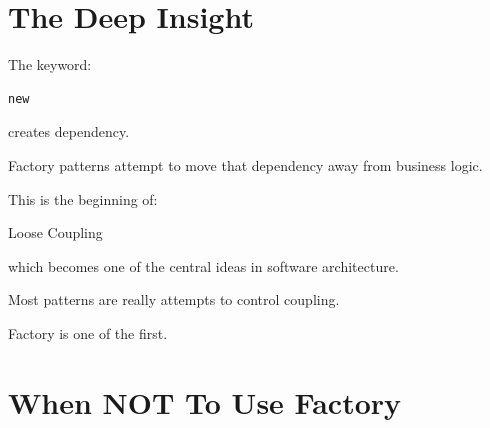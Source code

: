 \documentclass[11pt,a4paper]{book}
\begin{document}

\section{The Deep Insight}

The keyword:

\begin{verbatim}
new
\end{verbatim}

creates dependency.


Factory patterns attempt to
move that dependency away
from business logic.


This is the beginning of:


Loose Coupling


which becomes one of the
central ideas in software
architecture.


\begin{idea}

Most patterns are really
attempts to control coupling.


Factory is one of the first.

\end{idea}


\section{When NOT To Use Factory}
\end{document}
